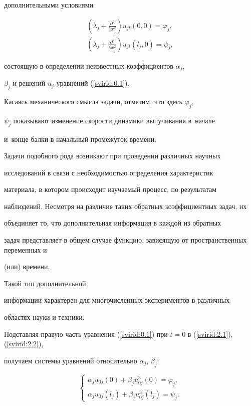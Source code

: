 до\-пол\-ни\-тель\-ны\-ми условиями

\begin{gather}\label{svirid:2.1}

\left(\lambda_j+\frac{\partial^2}{\partial x_j^2}\right)u_{jt}(0, 0)=\varphi_j,

\\

\label{svirid:2.2}

\left(\lambda_j+\frac{\partial^2}{\partial x_j^2}\right)u_{jt}(l_j, 0)=\psi_j,

\end{gather}

состоящую в определении неизвестных коэффициентов $\alpha_j$,

$\beta_j$ и решений $u_j$ урав\-не\-ний (\ref{svirid:0.1}).

Касаясь механического смысла задачи, отметим, что здесь $\varphi_j$,

$\psi_j$ показывают изменение скорости динамики выпучивания в~начале

и~конце балки в начальный промежуток времени.



Задачи подобного рода возникают при проведении различных науч\-ных

ис\-сле\-до\-ва\-ний в связи с необходимостью определения характеристик

материала, в котором происходит изучаемый процесс, по результатам

наб\-лю\-де\-ний. Несмотря на различие таких обратных коэффициентных задач, их

объеди\-ня\-ет то, что дополнительная информация в каждой из обратных

за\-дач представляет в общем случае функцию, зависящую от про\-странст\-вен\-ных переменных и

(или) времени.

Такой тип дополнительной

ин\-фор\-ма\-ции характерен для многочисленных экс\-пе\-ри\-мен\-тов в различных

областях нау\-ки и техники.



Подставляя правую часть уравнения (\ref{svirid:0.1}) при $t=0$ в (\ref{svirid:2.1}), (\ref{svirid:2.2}),

получаем системы уравнений относительно $\alpha_j$, $\beta_j$:

\begin{equation}\label{svirid:2.3}

\left \{

\begin{array}{l}

\alpha_j u_{0j}(0)+\beta_j u_{0j}^3(0)=\varphi_j, \\

\alpha_j u_{0j}(l_j)+\beta_ju_{0j}^3(l_j)=\psi_j.

\end{array} \right.

\end{equation}

